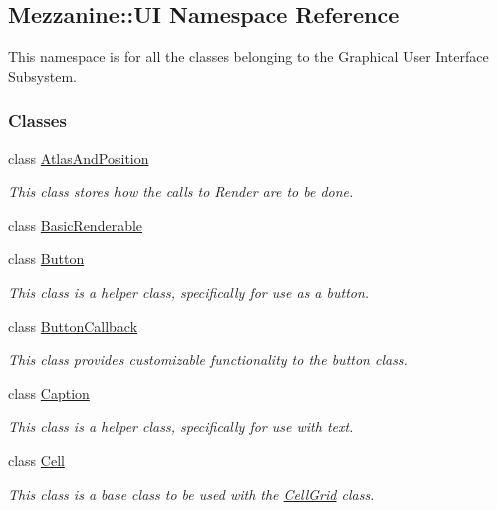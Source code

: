 \hypertarget{namespaceMezzanine_1_1UI}{
\subsection{Mezzanine::UI Namespace Reference}
\label{namespaceMezzanine_1_1UI}
}


This namespace is for all the classes belonging to the Graphical User Interface Subsystem.  


\subsubsection*{Classes}
\begin{DoxyCompactItemize}
\item 
class \hyperlink{structMezzanine_1_1UI_1_1AtlasAndPosition}{AtlasAndPosition}
\begin{DoxyCompactList}\small\item\em This class stores how the calls to Render are to be done. \item\end{DoxyCompactList}\item 
class \hyperlink{classMezzanine_1_1UI_1_1BasicRenderable}{BasicRenderable}
\item 
class \hyperlink{classMezzanine_1_1UI_1_1Button}{Button}
\begin{DoxyCompactList}\small\item\em This class is a helper class, specifically for use as a button. \item\end{DoxyCompactList}\item 
class \hyperlink{classMezzanine_1_1UI_1_1ButtonCallback}{ButtonCallback}
\begin{DoxyCompactList}\small\item\em This class provides customizable functionality to the button class. \item\end{DoxyCompactList}\item 
class \hyperlink{classMezzanine_1_1UI_1_1Caption}{Caption}
\begin{DoxyCompactList}\small\item\em This class is a helper class, specifically for use with text. \item\end{DoxyCompactList}\item 
class \hyperlink{classMezzanine_1_1UI_1_1Cell}{Cell}
\begin{DoxyCompactList}\small\item\em This class is a base class to be used with the \hyperlink{classMezzanine_1_1UI_1_1CellGrid}{CellGrid} class. \item\end{DoxyCompactList}\item 

\end{DoxyCompactItemize}
